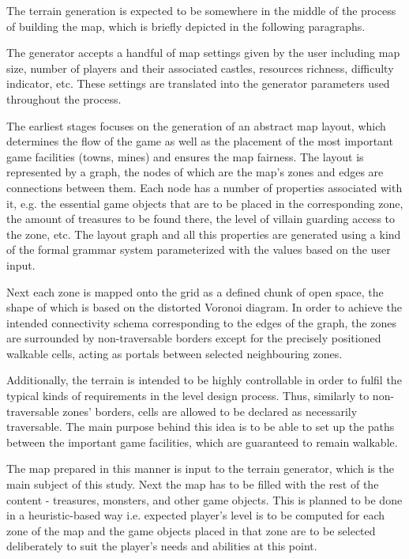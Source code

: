 \documentclass[a4paper, 11pt]{article} %
\begin{document}
The terrain generation is expected to be somewhere in the middle of the process of building the map, which is briefly depicted in the following paragraphs.

The generator accepts a handful of map settings given by the user including map size, number of players and their associated castles, resources richness, difficulty indicator, etc. These settings are translated into the generator parameters used throughout the process.

The earliest stages focuses on the generation of an abstract map layout, which determines the flow of the game as well as the placement of the most important game facilities (towns, mines) and ensures the map fairness. The layout is represented by a graph, the nodes of which are the map's zones and edges are connections between them. Each node has a number of properties associated with it, e.g. the essential game objects that are to be placed in the corresponding zone, the amount of treasures to be found there, the level of villain guarding access to the zone, etc. The layout graph and all this properties are generated using a kind of the formal grammar system parameterized with the values based on the user input. 

Next each zone is mapped onto the grid as a defined chunk of open space, the shape of which is based on the distorted Voronoi diagram. In order to achieve the intended connectivity schema corresponding to the edges of the graph, the zones are surrounded by non-traversable borders except for the precisely positioned walkable cells, acting as portals between selected neighbouring zones. 

Additionally, the terrain is intended to be highly controllable in order to fulfil the typical kinds of requirements in the level design process. Thus, similarly to non-traversable zones' borders, cells are allowed to be declared as necessarily traversable. The main purpose behind this idea is to be able to set up the paths between the important game facilities, which are guaranteed to remain walkable.

The map prepared in this manner is input to the terrain generator, which is the main subject of this study. Next the map has to be filled with the rest of the content - treasures, monsters, and other game objects. This is planned to be done in a heuristic-based way i.e. expected player's level is to be computed for each zone of the map and the game objects placed in that zone are to be selected deliberately to suit the player's needs and abilities at this point.
\end{document}
